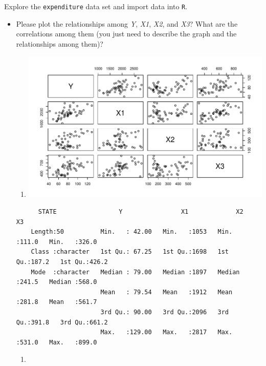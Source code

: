 \documentclass[12pt,letterpaper]{article}
\begin{document}
\vspace{.5cm}
\noindent Explore the \texttt{expenditure} data set and import data into \texttt{R}.
\vspace{.5cm}
  
\vspace{.5cm}
\begin{itemize}

\item
Please plot the relationships among \emph{Y}, \emph{X1}, \emph{X2}, and \emph{X3}? What are the correlations among them (you just need to describe the graph and the relationships among them)?


    \begin{enumerate}
	\item[]
	\includegraphics[width=.85\textwidth]{plot.all relationship_RJ.C.pdf}
   \end{enumerate}

	\begin{verbatim}
	  STATE                 Y                X1             X2              X3       
	Length:50          Min.   : 42.00   Min.   :1053   Min.   :111.0   Min.   :326.0  
	Class :character   1st Qu.: 67.25   1st Qu.:1698   1st Qu.:187.2   1st Qu.:426.2  
	Mode  :character   Median : 79.00   Median :1897   Median :241.5   Median :568.0  
	                   Mean   : 79.54   Mean   :1912   Mean   :281.8   Mean   :561.7  
	                   3rd Qu.: 90.00   3rd Qu.:2096   3rd Qu.:391.8   3rd Qu.:661.2  
	                   Max.   :129.00   Max.   :2817   Max.   :531.0   Max.   :899.0 
  \end{verbatim} 

  \begin{enumerate}
  	\item[]

\end{enumerate}
\end{itemize}
\end{document}
